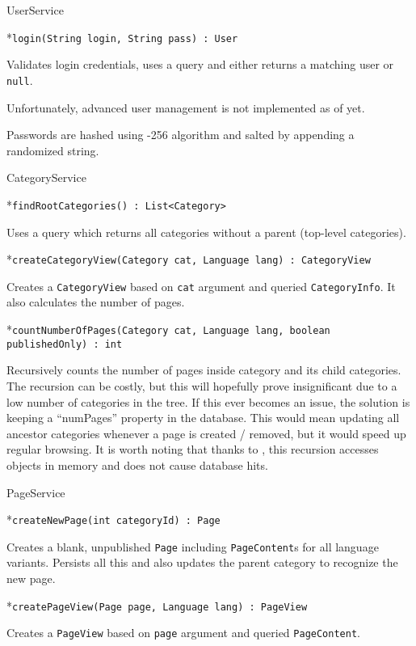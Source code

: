 \vfil \break

\secc UserService

\begitems

*{\tt login(String login, String pass) : User}

Validates login credentials, uses a  query and either returns a matching user or {\tt null}.

\enditems

Unfortunately, advanced user management is not implemented as of yet.

Passwords are hashed using -256 algorithm and salted by appending a randomized string.

\secc CategoryService

\begitems

*{\tt findRootCategories() : List<Category>}

Uses a  query which returns all categories without a parent (top-level categories).

*{\tt createCategoryView(Category cat, Language lang) : CategoryView}

Creates a {\tt CategoryView} based on {\tt cat} argument and queried {\tt CategoryInfo}. It also calculates the number of pages.

*{\tt countNumberOfPages(Category cat, Language lang, boolean publishedOnly) : int}

Recursively counts the number of pages inside category and its child categories. The recursion can be costly, but this will hopefully prove insignificant due to a low number of categories in the tree. If this ever becomes an issue, the solution is keeping a “numPages” property in the database. This would mean updating all ancestor categories whenever a page is created / removed, but it would speed up regular browsing. It is worth noting that thanks to , this recursion accesses objects in memory and does not cause database hits.

\enditems

\secc PageService

\begitems

*{\tt createNewPage(int categoryId) : Page}

Creates a blank, unpublished {\tt Page} including {\tt PageContent}s for all language variants. Persists all this and also updates the parent category to recognize the new page.

*{\tt createPageView(Page page, Language lang) : PageView}

Creates a {\tt PageView} based on {\tt page} argument and queried {\tt PageContent}.

